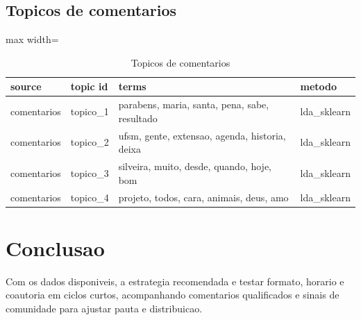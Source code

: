 \documentclass[12pt,a4paper]{article}
\begin{document}
\subsection{Topicos de comentarios}
\begin{table}[H]
\centering
\scriptsize
\begin{adjustbox}{max width=\textwidth}
\begin{tabular}{l l l l}
\toprule
source & topic id & terms & metodo \\
\midrule
comentarios & topico\_1 & parabens, maria, santa, pena, sabe, resultado & lda\_sklearn \\
comentarios & topico\_2 & ufsm, gente, extensao, agenda, historia, deixa & lda\_sklearn \\
comentarios & topico\_3 & silveira, muito, desde, quando, hoje, bom & lda\_sklearn \\
comentarios & topico\_4 & projeto, todos, cara, animais, deus, amo & lda\_sklearn \\
\bottomrule
\end{tabular}
\end{adjustbox}
\caption{Topicos de comentarios}
\label{tab:topics\_comments}
\end{table}

\section{Conclusao}
Com os dados disponiveis, a estrategia recomendada e testar formato, horario e coautoria em ciclos curtos, acompanhando comentarios qualificados e sinais de comunidade para ajustar pauta e distribuicao.
\end{document}
